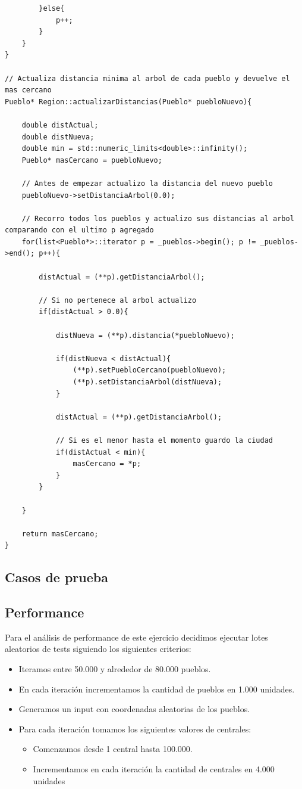 \begin{lstlisting}
		}else{
			p++;
		}
	}
}

// Actualiza distancia minima al arbol de cada pueblo y devuelve el mas cercano
Pueblo* Region::actualizarDistancias(Pueblo* puebloNuevo){

	double distActual;
	double distNueva;
	double min = std::numeric_limits<double>::infinity();
	Pueblo* masCercano = puebloNuevo;

	// Antes de empezar actualizo la distancia del nuevo pueblo
	puebloNuevo->setDistanciaArbol(0.0);

	// Recorro todos los pueblos y actualizo sus distancias al arbol comparando con el ultimo p agregado
	for(list<Pueblo*>::iterator p = _pueblos->begin(); p != _pueblos->end(); p++){

		distActual = (**p).getDistanciaArbol();

		// Si no pertenece al arbol actualizo
		if(distActual > 0.0){

			distNueva = (**p).distancia(*puebloNuevo);
			
			if(distNueva < distActual){
				(**p).setPuebloCercano(puebloNuevo);
				(**p).setDistanciaArbol(distNueva);
			}

			distActual = (**p).getDistanciaArbol();

			// Si es el menor hasta el momento guardo la ciudad
			if(distActual < min){
				masCercano = *p;
			}
		}
	
	}

	return masCercano;
}

\end{lstlisting}

\subsection{Casos de prueba}

\subsection{Performance}

Para el an\'alisis de performance de este ejercicio decidimos ejecutar lotes aleatorios de tests siguiendo los siguientes criterios:

\begin{itemize}
	\item Iteramos entre 50.000 y alrededor de 80.000 pueblos.
	\item En cada iteraci\'on incrementamos la cantidad de pueblos en 1.000 unidades.
	\item Generamos un input con coordenadas aleatorias de los pueblos.
	\item Para cada iteraci\'on tomamos los siguientes valores de centrales:
	\begin{itemize}
		\item Comenzamos desde 1 central hasta 100.000.
		\item Incrementamos en cada iteraci\'on la cantidad de centrales en 4.000 unidades
	\end{itemize}
\end{itemize}

